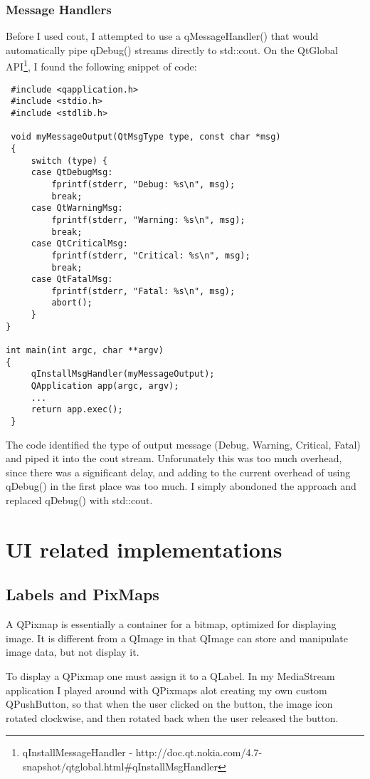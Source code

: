 \subsubsection{Message Handlers}
Before I used cout, I attempted to use a qMessageHandler() that would automatically pipe qDebug() streams directly to std::cout. On the QtGlobal API\footnote{qInstallMessageHandler - http://doc.qt.nokia.com/4.7-snapshot/qtglobal.html\#qInstallMsgHandler}, I found the following snippet of code:
\begin{lstlisting}
 #include <qapplication.h>
 #include <stdio.h>
 #include <stdlib.h>

 void myMessageOutput(QtMsgType type, const char *msg)
 {
     switch (type) {
     case QtDebugMsg:
         fprintf(stderr, "Debug: %s\n", msg);
         break;
     case QtWarningMsg:
         fprintf(stderr, "Warning: %s\n", msg);
         break;
     case QtCriticalMsg:
         fprintf(stderr, "Critical: %s\n", msg);
         break;
     case QtFatalMsg:
         fprintf(stderr, "Fatal: %s\n", msg);
         abort();
     }
}

int main(int argc, char **argv)
{
     qInstallMsgHandler(myMessageOutput);
     QApplication app(argc, argv);
     ...
     return app.exec();
 }
\end{lstlisting}
The code identified the type of output message (Debug, Warning, Critical, Fatal) and piped it into the cout stream. Unforunately this was too much overhead, since there was a significant delay, and adding to the current overhead of using qDebug() in the first place was  too much. I simply abondoned the approach and replaced qDebug() with std::cout.

\section{UI related implementations}\label{widgetstuff}

\subsection{Labels and PixMaps}
A QPixmap is essentially a container for a bitmap, optimized for displaying image. It is different from a QImage in that QImage can store and manipulate image data, but not display it.

To display a QPixmap one must assign it to a QLabel. In my MediaStream application I played around with QPixmaps alot creating my own custom QPushButton, so that when the user clicked on the button, the image icon rotated clockwise, and then rotated back when the user released the button.

